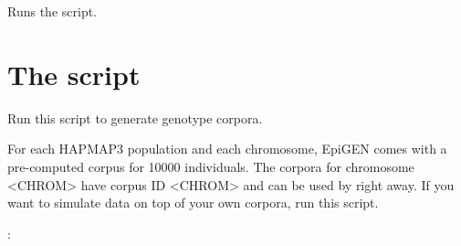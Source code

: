 \documentclass[a4paper,10pt,english]{sphinxhowto}
\begin{document}
\begin{fulllineitems}
\label{\detokenize{simulate_data:simulate_data.run_script}}
Runs the script.

\end{fulllineitems}



\section{The script }
\label{\detokenize{generate_genotype_corpus:module-generate_genotype_corpus}}\label{\detokenize{generate_genotype_corpus:the-script-generate-genotype-corpus-py}}\label{\detokenize{generate_genotype_corpus::doc}}
Run this script to generate genotype corpora.

For each HAPMAP3 population and each chromosome, EpiGEN comes with a pre-computed corpus for 10000 individuals.
The corpora for chromosome \textless{}CHROM\textgreater{} have corpus ID \textless{}CHROM\textgreater{} and can be used by  right away.
If you want to simulate data on top of your own corpora, run this script.

:
\end{document}
